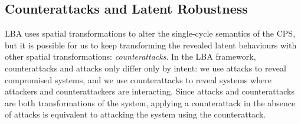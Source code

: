 {{\subsection{Counterattacks and Latent Robustness}
\label{sec:CPSRobustness:CounterAttacks}
LBA uses spatial transformations to alter the single-cycle semantics of the CPS, but it is possible for us to keep transforming the revealed latent behaviours with other spatial transformations: \emph{counterattacks}. In the LBA framework, counterattacks and attacks only differ only by intent: we use attacks to reveal compromised systems, and we use counterattacks to reveal systems where attackers and counterattackers are interacting. Since attacks and counterattacks are both transformations of the system, applying a counterattack in the absence of attacks is equivalent to attacking the system using the counterattack. %

}}
